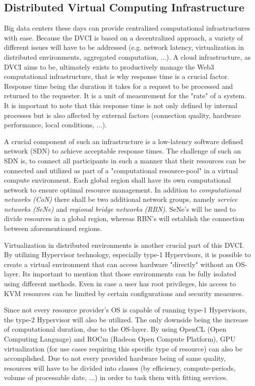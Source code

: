 \documentclass[]{article}
\begin{document}
\subsection{Distributed Virtual Computing Infrastructure}
Big data centers these days can provide centralized computational infrastructures with ease.
Because the DVCI is based on a decentralized approach, a variety of different issues will have to be addressed (e.g. network latency, virtualization in distributed environments, aggregated computation, ...).
A cloud infrastructure, as DVCI aims to be, ultimately exists to productively manage the Web3 computational infrastructure, that is why response time is a crucial factor. 
Response time being the duration it takes for a request to be processed and returned to the requester.
It is a unit of measurement for the "rate" of a system. 
It is important to note that this response time is not only defined by internal processes but is also affected by external factors (connection quality, hardware performance, local conditions, ...).

A crucial component of such an infrastructure is a low-latency software defined network (SDN) to achieve acceptable response times.
The challenge of such an SDN is, to connect all participants in such a manner that their resources can be connected and utilized as part of a "computational resource-pool" in a virtual compute environment.
Each global region shall have its own computational network to ensure optimal resource management.
In addition to \textit{computational networks (CoN)} there shall be two additional network groups, namely \textit{service networks (SeNe)} and \textit{regional bridge networks (RBN)}.
SeNe's will be used to divide resources in a global region, whereas RBN's will establish the connection between aforementioned regions.

Virtualization in distributed environments is another crucial part of this DVCI.
By utilizing Hypervisor technology, especially type-1 Hypervisors, it is possible to create a virtual environment that can access hardware "directly" without an OS-layer.
Its important to mention that those environments can be fully isolated using different methods.
Even in case a user has root privileges, his access to KVM resources can be limited by certain configurations and security measures.

Since not every resource provider's OS is capable of running type-1 Hypervisors, the type-2 Hypervisor will also be utilized.
The only downside being the increase of computational duration, due to the OS-layer.
By using OpenCL (Open Computing Language) and ROCm (Radeon Open Compute Platform), GPU virtualization (for use cases requiring this specific type of resource) can also be accomplished.
Due to not every provided hardware being of same quality, resources will have to be divided into classes (by efficiency, compute-periods, volume of processable date, ...) in order to task them with fitting services.
\end{document}
